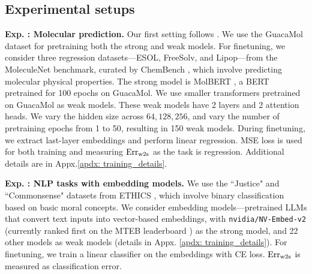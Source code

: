 \subsection{Experimental setups}

\textbf{Exp. : Molecular prediction.} Our first setting follows \cite{charikar2024quantifying}. We use the GuacaMol \cite{brown2019guacamol} dataset for pretraining both the strong and weak models. For finetuning, we consider three regression datasets—ESOL, FreeSolv, and Lipop—from the MoleculeNet \cite{wu2018moleculenet} benchmark, curated by ChemBench \cite{charleshen_2020_4054866}, which involve predicting molecular physical properties.  The strong model is MolBERT \cite{fabian2020molecular},  a BERT \cite{devlin2018bert}  pretrained for 100 epochs on GuacaMol. We use smaller transformers pretrained on GuacaMol as weak models. These weak models have 2 layers and 2 attention heads. We vary the hidden size across ${64, 128, 256}$, and vary the number of pretraining epochs from 1 to 50, resulting in 150 weak models. During finetuning, we extract last-layer embeddings and perform linear regression. {MSE loss is used for both training and measuring $\text{Err}_{\text{w2s}}$ as the task is regression.} Additional details are in Appx.\ref{apdx: training_details}. 


\textbf{Exp. : NLP tasks with embedding models.}
We use the ``Justice" and ``Commonsense" datasets from ETHICS \cite{hendrycks2020aligning}, which involve binary classification based on basic moral concepts.
We consider embedding models—pretrained LLMs that convert text inputs into vector-based embeddings, with \texttt{nvidia/NV-Embed-v2} \cite{lee2024nv} (currently ranked first on the MTEB leaderboard \cite{muennighoff2022mteb}) as the strong model, and 22 other models as weak models (details in Appx. \ref{apdx: training_details}). For finetuning, we train a linear classifier on the embeddings {with CE loss. $\text{Err}_{\text{w2s}}$ is measured as classification error.}


